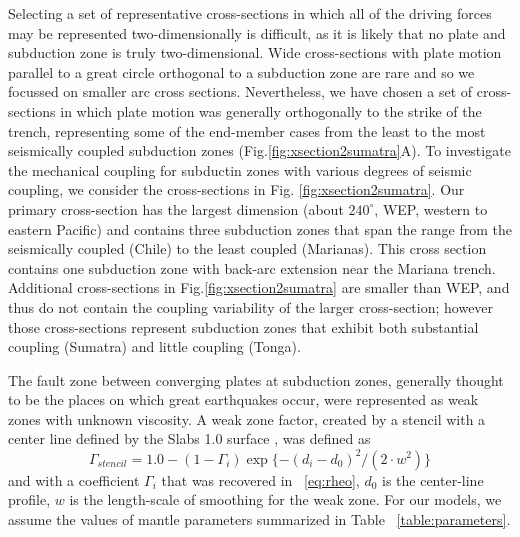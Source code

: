 \documentclass[12pt]{article}
\begin{document}
{Selecting a set of representative cross-sections in which all of the driving forces may be represented two-dimensionally is difficult, as it is likely that no plate and subduction zone is truly two-dimensional. 
Wide cross-sections with plate motion parallel to a great circle orthogonal to a subduction zone are rare and so we focussed on smaller arc cross sections. 
Nevertheless, we have chosen a set of cross-sections in which plate motion was generally orthogonally to the strike of the trench, representing some of the end-member cases from the least to the most seismically coupled subduction zones (Fig.\ref{fig:xsection2sumatra}A). 
To investigate the mechanical coupling for subductin zones with various degrees of seismic coupling, we consider the cross-sections in Fig. \ref{fig:xsection2sumatra}. 
Our primary cross-section has the largest dimension (about $240^{\circ}$, WEP, western to eastern Pacific) and contains three subduction zones that span the range from the seismically coupled (Chile) to the least coupled (Marianas). This cross section contains one subduction zone with back-arc extension near the Mariana trench. Additional cross-sections in Fig.\ref{fig:xsection2sumatra} are smaller than WEP, and thus do not contain the coupling variability of the larger cross-section; however those cross-sections represent subduction zones that exhibit both substantial coupling (Sumatra) and little coupling (Tonga).




The fault zone between converging plates at subduction zones, generally thought to be the places on which great earthquakes occur, were represented as weak zones with unknown viscosity. 
A weak zone factor, created by a stencil with a center line defined by the Slabs 1.0 surface \citep{Hayes2012}, was defined as
\begin{equation}
\Gamma_{stencil} = 1.0 - (1-\Gamma_i)\exp\{-(d_i-d_0)^2/(2\cdot w^2)\}
\end{equation}
and with a coefficient $\Gamma_i$ that was recovered in ~\eqref{eq:rheo}, $d_0$ is the center-line profile, $w$ is the length-scale of smoothing for the weak zone.
 For our models, we assume the values of mantle parameters summarized in Table ~\ref{table:parameters}.

}
\end{document}
